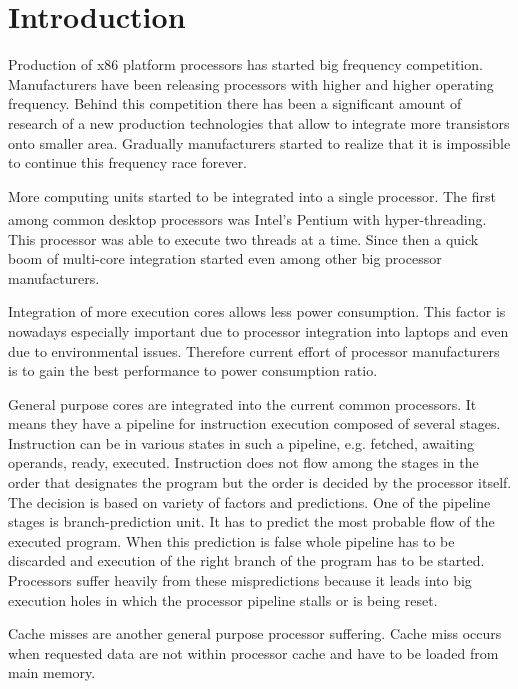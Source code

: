 \chapter{Introduction}

\par
Production of x86 platform processors has started big frequency competition.
Manufacturers have been releasing processors with higher and higher operating frequency.
Behind this competition there has been a significant amount of research of a new production technologies that allow to integrate more transistors onto smaller area.
Gradually manufacturers started to realize that it is impossible to continue this frequency race forever.

\par
More computing units started to be integrated into a single processor.
The first among common desktop processors was Intel's Pentium\textsuperscript{\textregistered} with hyper-threading.
This processor was able to execute two threads at a time.
Since then a quick boom of multi-core integration started even among other big processor manufacturers.

\par
Integration of more execution cores allows less power consumption.
This factor is nowadays especially important due to processor integration into laptops and even due to environmental issues.
Therefore current effort of processor manufacturers is to gain the best performance to power consumption ratio.

\par
General purpose cores are integrated into the current common processors.
It means they have a pipeline for instruction execution composed of several stages.
Instruction can be in various states in such a pipeline, e.g. fetched, awaiting operands, ready, executed.
Instruction does not flow among the stages in the order that designates the program but the order is decided by the processor itself.
The decision is based on variety of factors and predictions.
One of the pipeline stages is branch-prediction unit.
It has to predict the most probable flow of the executed program.
When this prediction is false whole pipeline has to be discarded and execution of the right branch of the program has to be started.
Processors suffer heavily from these mispredictions because it leads into big execution holes in which the processor pipeline stalls or is being reset.

\par
Cache misses are another general purpose processor suffering.
Cache miss occurs when requested data are not within processor cache and have to be loaded from main memory.

